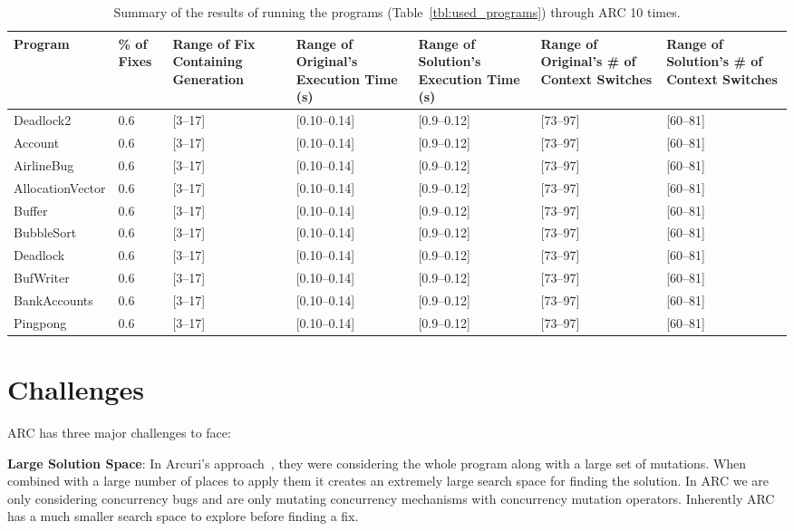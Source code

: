 \documentclass[10pt, conference, compsocconf]{IEEEtran}
\begin{document}
\begin{table}[!t]
\begin{center}
\begin{tabular}{|p{2cm}|p{0.6cm}|p{1.75cm}|p{2cm}|p{2cm}|p{2cm}|p{2cm}|}
\hline
\textbf{Program} &
\textbf{\% of Fixes} &
\textbf{Range of Fix Containing Generation} &
\textbf{Range of Original's Execution Time (s)} &
\textbf{Range of Solution's Execution Time (s)} &
\textbf{Range of Original's \# of Context Switches} &
\textbf{Range of Solution's \# of Context Switches}
\\\hline
Deadlock2 & 0.6 & [3--17] & [0.10--0.14] & [0.9--0.12] & [73--97] & [60--81]
\\\hline
Account & 0.6 & [3--17] & [0.10--0.14] & [0.9--0.12] & [73--97] & [60--81]
\\\hline
AirlineBug & 0.6 & [3--17] & [0.10--0.14] & [0.9--0.12] & [73--97] & [60--81]
\\\hline
AllocationVector & 0.6 & [3--17] & [0.10--0.14] & [0.9--0.12] & [73--97] & [60--81]
\\\hline
Buffer & 0.6 & [3--17] & [0.10--0.14] & [0.9--0.12] & [73--97] & [60--81]
\\\hline
BubbleSort & 0.6 & [3--17] & [0.10--0.14] & [0.9--0.12] & [73--97] & [60--81]
\\\hline
Deadlock & 0.6 & [3--17] & [0.10--0.14] & [0.9--0.12] & [73--97] & [60--81]
\\\hline
BufWriter & 0.6 & [3--17] & [0.10--0.14] & [0.9--0.12] & [73--97] & [60--81]
\\\hline
BankAccounts & 0.6 & [3--17] & [0.10--0.14] & [0.9--0.12] & [73--97] & [60--81]
\\\hline
Pingpong & 0.6 & [3--17] & [0.10--0.14] & [0.9--0.12] & [73--97] & [60--81]
\\\hline
\end{tabular}
\caption{Summary of the results of running the programs (Table~\ref{tbl:used_programs}) through ARC 10 times.}
\label{tbl:summary_results}
\end{center}
\end{table}


\section{Challenges}
\label{sec:challenges}

ARC has three major challenges to face:

\textbf{Large Solution Space}: In Arcuri's approach~\cite{AY08}, they were
considering the whole program along with a large set of mutations. When combined
with a large number of places to apply them it creates an extremely large search space
for finding the solution. In ARC we are only considering concurrency bugs and are 
only mutating concurrency mechanisms with concurrency mutation operators. Inherently
ARC has a much smaller search space to explore before finding a fix. 
\end{document}
